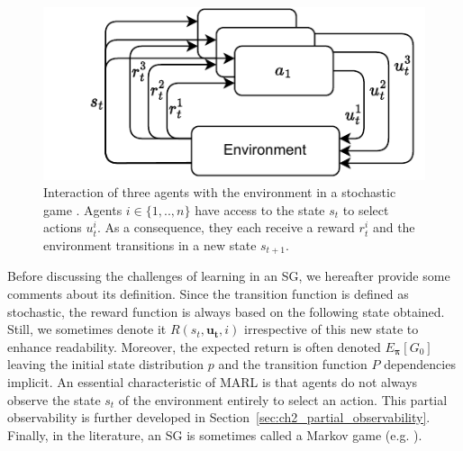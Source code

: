 \begin{figure}
    \centering
    \includegraphics[width=.8\textwidth]{tex_thesis/figures/ch2/SG.pdf}
    \caption{Interaction of three agents with the environment in a stochastic game \citep{stochasticGames}. Agents $i \in \{1,..,n\}$ have access to the state $s_t$ to select actions $u_t^i$. As a consequence, they each receive a reward $r_t^i$ and the environment transitions in a new state $s_{t+1}$.}
    \label{fig:ch2_sg}
\end{figure}

Before discussing the challenges of learning in an SG, we hereafter provide some comments about its definition. 
Since the transition function is defined as stochastic, the reward function is always based on the following state obtained.
Still, we sometimes denote it  $R(s_t, \mathbf{u_t}, i)$ irrespective of this new state to enhance readability.
Moreover, the expected return is often denoted $E_{\mathbf{\pi}} \left[ G_0 \right]$ leaving the initial state distribution $p$ and the transition function $P$ dependencies implicit.
An essential characteristic of MARL is that agents do not always observe the state $s_t$ of the environment entirely to select an action.
This partial observability is further developed in Section~\ref{sec:ch2_partial_observability}.
Finally, in the literature, an SG is sometimes called a Markov game (e.g. \citep{MarkovGames}).

